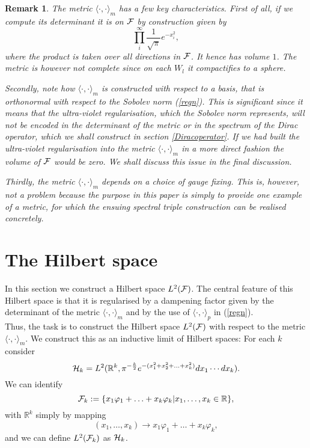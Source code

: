 \documentclass[letterpaper,11pt]{article}
\def\cf{{\cal F}}
\def\ch{{\cal H}}
\newtheorem{remark}{Remark}
\newcommand{\cF}{{\cal F}}
\newcommand{\R}{\mathbb{ R}}
\begin{document}
\begin{remark}
The metric $\langle \cdot ,\cdot \rangle_m$ has a few key characteristics. First of all, if we compute its determinant it is on $\cf$ by construction given by 
$$\prod_i^\infty \frac{1}{\sqrt{\pi}}e^{-x_i^2} ,$$
where the product is taken over all directions in $\cf$. It hence has volume $1$. The metric is however not complete since on each $W_l$ it compactifies to a sphere.  

Secondly, note how $\langle \cdot ,\cdot \rangle_m$ is constructed with respect to a basis, that is orthonormal with respect to the Sobolev norm (\ref{regn}). This is significant since it means that the ultra-violet regularisation, which the Sobolev norm represents, will not be encoded in the determinant of the metric or in the spectrum of the Dirac operator, which we shall construct in section \ref{Diracoperator}. If we had built the ultra-violet regularisation into the metric $\langle \cdot ,\cdot \rangle_m$ in a more direct fashion the volume of $\cf$ would be zero. We shall discuss this issue in the final discussion.



Thirdly, the metric $\langle \cdot ,\cdot \rangle_m$ depends on a choice of gauge fixing. This is, however, not a problem because the purpose in this paper is simply to provide one example of a metric, for which the ensuing spectral triple construction can be realised concretely. 
\end{remark}




\section{The Hilbert space}

In this section we construct a Hilbert space $L^2(\cf)$. The central feature of this Hilbert space is that it is regularised by a dampening factor given by the determinant of the metric $\langle \cdot    , \cdot  \rangle_m$ and by the use of $\langle \cdot , \cdot \rangle_p$ in (\ref{regn}).\\



Thus, the task is to construct the Hilbert space $L^2(\cF)$ with respect to the metric $\langle \cdot ,\cdot \rangle_m$. We construct this as an inductive limit of Hilbert spaces: For each $k$ consider 
$$\ch_k=L^2(\R^k,\pi^{-\frac{k}{2}}e^{-(x_1^2+x_2^2+\ldots +x_k^2)}dx_1\cdots dx_k).$$
We can identify 
$$\cF_k:=\{x_1\varphi_1+\ldots + x_k\varphi_k| x_1,\ldots ,x_k\in \R\},$$
with $\R^k$ simply by mapping 
$$(x_1,\ldots , x_k) \to  x_1\varphi_1+\ldots + x_k\varphi_k ,$$
and we can define $L^2(\cF_k)$ as $\ch_k$. 
\end{document}
